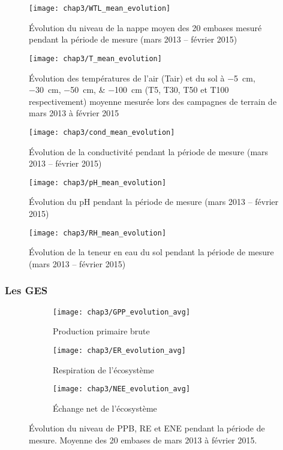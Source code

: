 \begin{figure}
\centering
\texttt{[image: chap3/WTL\_mean\_evolution]}
\caption{Évolution du niveau de la nappe moyen des 20 embases mesuré pendant la période de mesure (mars 2013 -- février 2015)}
\label{fig:WTL_mean_evolution}
\end{figure}


\begin{figure}
\centering
\texttt{[image: chap3/T\_mean\_evolution]}
\caption{Évolution des températures de l'air (Tair) et du sol à \SIlist{-5;-30;-50;-100}{\centi\metre} (T5, T30, T50 et T100 respectivement) moyenne mesurée lors des campagnes de terrain de mars 2013 à février 2015}
\label{fig:T_mean_evolution}
\end{figure}


\begin{figure}
\centering
\texttt{[image: chap3/cond\_mean\_evolution]}
\caption{Évolution de la conductivité pendant la période de mesure (mars 2013 -- février 2015)}
\label{fig:cond_mean_evolution}
\end{figure}

\begin{figure}
\centering
\texttt{[image: chap3/pH\_mean\_evolution]}
\caption{Évolution du pH pendant la période de mesure (mars 2013 -- février 2015)}
\label{fig:pH_mean_evolution}
\end{figure}


\begin{figure}
\centering
\texttt{[image: chap3/RH\_mean\_evolution]}
\caption{Évolution de la teneur en eau du sol pendant la période de mesure (mars 2013 -- février 2015)}
\label{fig:RH_mean_evolution}
\end{figure}
\subsubsection{Les GES}


\begin{figure}
	\centering
	\begin{subfigure}[t]{\textwidth}
		\centering
		\texttt{[image: chap3/GPP\_evolution\_avg]}
		\caption{Production primaire brute}
		\label{fig:GPP_evolution_avg}
	\end{subfigure}%
	
	\begin{subfigure}[t]{\textwidth}
		\centering
		\texttt{[image: chap3/ER\_evolution\_avg]}
		\caption{Respiration de l'écosystème}
		\label{fig:ER_evolution_avg}
	\end{subfigure}
	
	\begin{subfigure}[t]{\textwidth}
		\centering
		\texttt{[image: chap3/NEE\_evolution\_avg]}
		\caption{Échange net de l'écosystème}
		\label{fig:NEE_evolution_avg}
	\end{subfigure}
\caption{Évolution du niveau de PPB, RE et ENE pendant la période de mesure. Moyenne des 20 embases de mars 2013 à février 2015.}
\label{fig:flux_evolution_avg}
\end{figure}

